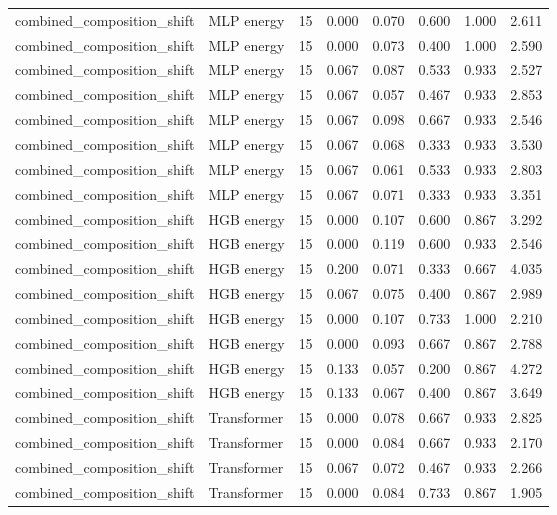 {\begin{longtable}{llrrrrrr}
combined\_composition\_shift & MLP energy & 15 & 0.000 & 0.070 & 0.600 & 1.000 & 2.611 \\
combined\_composition\_shift & MLP energy & 15 & 0.000 & 0.073 & 0.400 & 1.000 & 2.590 \\
combined\_composition\_shift & MLP energy & 15 & 0.067 & 0.087 & 0.533 & 0.933 & 2.527 \\
combined\_composition\_shift & MLP energy & 15 & 0.067 & 0.057 & 0.467 & 0.933 & 2.853 \\
combined\_composition\_shift & MLP energy & 15 & 0.067 & 0.098 & 0.667 & 0.933 & 2.546 \\
combined\_composition\_shift & MLP energy & 15 & 0.067 & 0.068 & 0.333 & 0.933 & 3.530 \\
combined\_composition\_shift & MLP energy & 15 & 0.067 & 0.061 & 0.533 & 0.933 & 2.803 \\
combined\_composition\_shift & MLP energy & 15 & 0.067 & 0.071 & 0.333 & 0.933 & 3.351 \\
combined\_composition\_shift & HGB energy & 15 & 0.000 & 0.107 & 0.600 & 0.867 & 3.292 \\
combined\_composition\_shift & HGB energy & 15 & 0.000 & 0.119 & 0.600 & 0.933 & 2.546 \\
combined\_composition\_shift & HGB energy & 15 & 0.200 & 0.071 & 0.333 & 0.667 & 4.035 \\
combined\_composition\_shift & HGB energy & 15 & 0.067 & 0.075 & 0.400 & 0.867 & 2.989 \\
combined\_composition\_shift & HGB energy & 15 & 0.000 & 0.107 & 0.733 & 1.000 & 2.210 \\
combined\_composition\_shift & HGB energy & 15 & 0.000 & 0.093 & 0.667 & 0.867 & 2.788 \\
combined\_composition\_shift & HGB energy & 15 & 0.133 & 0.057 & 0.200 & 0.867 & 4.272 \\
combined\_composition\_shift & HGB energy & 15 & 0.133 & 0.067 & 0.400 & 0.867 & 3.649 \\
combined\_composition\_shift & Transformer & 15 & 0.000 & 0.078 & 0.667 & 0.933 & 2.825 \\
combined\_composition\_shift & Transformer & 15 & 0.000 & 0.084 & 0.667 & 0.933 & 2.170 \\
combined\_composition\_shift & Transformer & 15 & 0.067 & 0.072 & 0.467 & 0.933 & 2.266 \\
combined\_composition\_shift & Transformer & 15 & 0.000 & 0.084 & 0.733 & 0.867 & 1.905 \\

\end{longtable}}
